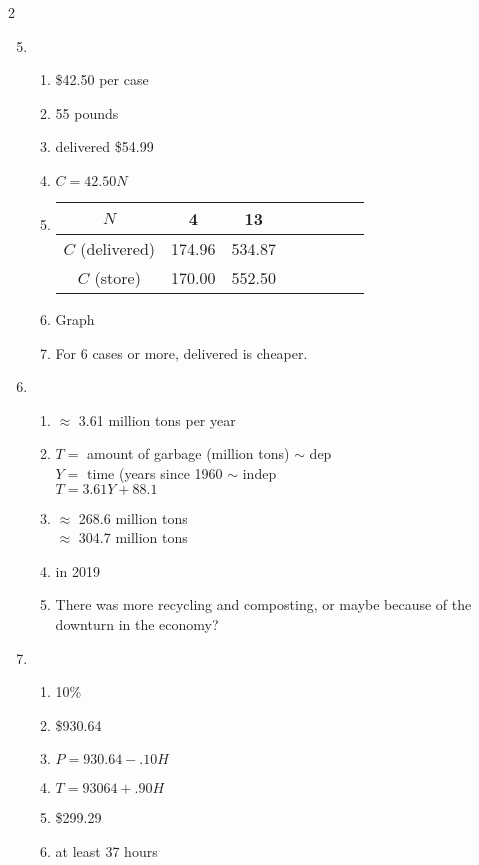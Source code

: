 \begin{multicols} {2}
\begin{enumerate}
\setcounter{enumi}{4}

\item %
\begin{enumerate}
\item \$42.50 per case
\item 55 pounds
\item delivered \$54.99 
\item $C=42.50N$
\item \begin{tabular} {|c| |c|c |c|c |c|c |c|}\hline
$N$ &4 & 13\\ \hline
$C$ (delivered) &  174.96 & 534.87  \\ \hline
$C$ (store)& 170.00 & 552.50 \\ \hline
\end{tabular}
\item Graph
\item For 6 cases or more, delivered is cheaper.
\end{enumerate}

\item %
\begin{enumerate}
\item $\approx$ 3.61 million tons per year
\item $T=$ amount of garbage (million tons) $\sim$ dep \\ $Y=$ time (years since 1960 $\sim$ indep \\ $T=3.61Y + 88.1$
\item $\approx$ 268.6 million tons \\ $\approx$ 304.7 million tons
\item in 2019
\item There was more recycling and composting, or maybe because of the downturn in the economy?
\end{enumerate}

\item %
\begin{enumerate}
\item 10\%
\item \$930.64
\item $P = 930.64-.10H$
\item $T = 93064 + .90H$
\item \$299.29
\item at least 37 hours
\end{enumerate}


\end{enumerate}
\end{multicols}
